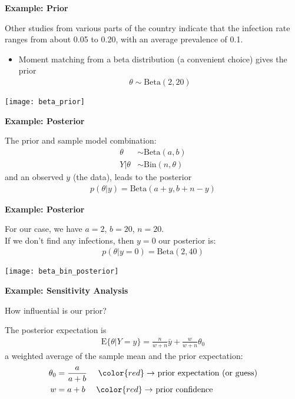 \documentclass[12pt,xcolor=svgnames]{beamer}
\newcommand{\rd}{\color{red}}
\newcommand{\theme}{\color{FireBrick}}
\newcommand{\mr}[1]{\mathrm{#1}}
\newcommand{\sk}{\vspace{.4cm}}
\newcommand{\chap}[1]{{\theme \Large \bf #1} \sk}
\begin{document}
\begin{frame}
\chap{Example: Prior}

Other studies from various parts of the country indicate that the infection rate ranges from about
0.05 to 0.20, with an average prevalence of 0.1. 
\begin{itemize}
\item Moment matching from a beta distribution (a convenient choice) gives the prior
\begin{align*}
\theta \sim \mr{Beta} (2,20)
\end{align*}
\end{itemize}
\begin{center}
\texttt{[image: beta\_prior]}
\end{center}

\end{frame}


\begin{frame}
\chap{Example: Posterior}

The prior and sample model combination:
\begin{align*}
\theta & \sim \mr{Beta} (a,b)\\
Y|\theta &  \sim \mr{Bin} (n, \theta)
\end{align*}
and an observed $y$ (the data), leads to the posterior 
\begin{align*}
p(\theta|y)=\mr{Beta}(a+y, b+n-y)
\end{align*}

\end{frame}


\begin{frame}
\chap{Example: Posterior}

For our case, we have $a=2$, $b=20$, $n=20$. \\

If we don't find any infections, then $y=0$ our posterior is:
\begin{align*}
p(\theta|y=0)=\mr{Beta}(2, 40)
\end{align*}
\begin{center}
\texttt{[image: beta\_bin\_posterior]}
\end{center}

\end{frame}

\begin{frame}
\chap{Example: Sensitivity Analysis }

How influential is our prior?

The posterior expectation is
\begin{align*}
\mr{E}\{\theta|Y=y\} =   \frac{n}{w+n} \bar{y} + \frac{w}{w+n} \theta_0
\end{align*}
a weighted average of the sample mean and the prior expectation:
\begin{align*}
\theta_0 & =  \frac{a}{a+b} ~~~~ {\rd \rightarrow} \text{ prior expectation (or guess)}\\
w & = a + b  ~~~~ {\rd \rightarrow} \text{  prior confidence} 
\end{align*}


\end{frame}
\end{document}
